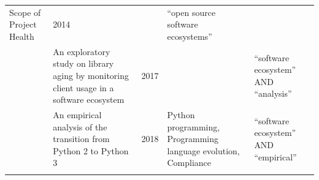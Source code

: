 \documentclass[]{book}
\begin{document}
\begin{longtable}[]{@{}lllll@{}}
\begin{minipage}[t]{0.31\columnwidth}
Scope of Project Health\strut
\end{minipage} & \begin{minipage}[t]{0.02\columnwidth}\raggedright\strut
2014\strut
\end{minipage} & \begin{minipage}[t]{0.34\columnwidth}\raggedright\strut
\strut
\end{minipage} & \begin{minipage}[t]{0.13\columnwidth}\raggedright\strut
``open source software ecosystems''\strut
\end{minipage}\tabularnewline
\begin{minipage}[t]{0.05\columnwidth}\raggedright\strut
\citet{Kula2017-2}\strut
\end{minipage} & \begin{minipage}[t]{0.31\columnwidth}\raggedright\strut
An exploratory study on library aging by monitoring client usage in a
software ecosystem\strut
\end{minipage} & \begin{minipage}[t]{0.02\columnwidth}\raggedright\strut
2017\strut
\end{minipage} & \begin{minipage}[t]{0.34\columnwidth}\raggedright\strut
\strut
\end{minipage} & \begin{minipage}[t]{0.13\columnwidth}\raggedright\strut
``software ecosystem'' AND ``analysis''\strut
\end{minipage}\tabularnewline
\begin{minipage}[t]{0.05\columnwidth}\raggedright\strut
\citet{Malloy2018}\strut
\end{minipage} & \begin{minipage}[t]{0.31\columnwidth}\raggedright\strut
An empirical analysis of the transition from Python 2 to Python 3\strut
\end{minipage} & \begin{minipage}[t]{0.02\columnwidth}\raggedright\strut
2018\strut
\end{minipage} & \begin{minipage}[t]{0.34\columnwidth}\raggedright\strut
Python programming, Programming language evolution, Compliance\strut
\end{minipage} & \begin{minipage}[t]{0.13\columnwidth}\raggedright\strut
``software ecosystem'' AND ``empirical''\strut
\end{minipage}\tabularnewline
\begin{minipage}[t]{0.05\columnwidth}\raggedright\strut

\end{minipage}
\end{longtable}
\end{document}
